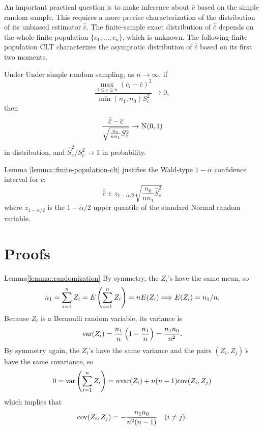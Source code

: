 An important practical question is to make inference about $ \bar{c} $ based on the simple random sample. This requires a more precise characterization of the distribution of its unbiased estimator $ \hat{\bar{c}} $. The finite-sample exact distribution of $ \hat{\bar{c}} $ depends on the whole finite population $\{  c_1, \ldots, c_n \}$, which is unknown. The following finite population CLT characterizes the asymptotic distribution of $ \hat{\bar{c}} $ based on its first two moments. 

\begin{lemma}
\label{lemma::finite-population-clt}
Under Under simple random sampling, as $n\rightarrow \infty$, if
$$
  \frac{ \max_{1\leq i \leq n}  (c_i -  \bar{c}  )^2 }{ \min(n_1, n_0)  S_c^2  } \rightarrow 0,
$$
then 
$$
\frac{  \hat{\bar{c}}  -  \bar{c}  }{   \sqrt{  \frac{ n_0}{n n_1  }  S_c^2}    } \rightarrow \textsc{N}(0,1)
$$
in distribution, and
$
 \hat{S}_c^2   / S_c^2   \rightarrow 1
$
in probability. 
\end{lemma}

Lemma \ref{lemma::finite-population-clt} justifies the Wald-type $1-\alpha$ confidence interval for $ \bar{c} $: 
$$
 \hat{\bar{c}}  \pm z_{1-\alpha/2}  \sqrt{  \frac{ n_0}{n n_1  }   \hat{S}_c^2  } 
$$
where $z_{1-\alpha/2} $ is the $1-\alpha/2$ upper quantile of the standard Normal random variable. 

\section{Proofs}




\begin{myproof}{Lemma}{\ref{lemma::randomization}}
By symmetry, the $Z_i$'s have the same mean, so
$$
n_1 = \sum_{i=1}^n Z_i = E\left (  \sum_{i=1}^n Z_i  \right  )  = n E(Z_i)
\Longrightarrow  E(Z_i) = n_1/n .
$$
Because $Z_i$ is a Bernoulli random variable, its variance is 
$$
\textup{var}(Z_i) = \frac{n_1}{ n} \left(1 - \frac{n_1}{n} \right) = \frac{n_1 n_0}{n^2}.
$$
By symmetry again, the $Z_i$'s have the same variance and the pairs $(Z_i, Z_j)$'s have the same covariance, so 
$$
0 = \textup{var}\left(   \sum_{i=1}^n Z_i \right)   = n   \textup{var}(Z_i) + n(n-1) \textup{cov}(Z_i, Z_j)
$$
which implies that  
$$
\textup{cov}(Z_i, Z_j) = - \frac{n_1 n_0 } { n^2 (n-1)  }  \quad (i\neq j).
$$
\end{myproof}




